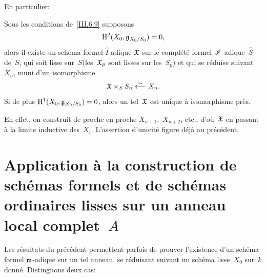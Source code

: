 En particulier:

\begin{corollaire}
\label{III.6.10}
Sous les conditions de~\ref{III.6.9} supposons
$$
\mathrm{H}^2(X_0,\mathfrak{g}_{X_0/S_0})=0,
$$
alors il existe un sch\'ema formel $\hat{I}$-adique
$\mathfrak{X}$
sur le compl\'et\'e formel $\cal{I}$-adique~$\hat{S}$ de~$S$, qui
soit \og lisse sur~$S$\fg (\ie les~$\mathfrak{X}_p$ sont lisses sur
les~$S_p$) et qui se r\'eduise suivant~$X_n$, \ie muni d'un
isomorphisme
$$
\mathfrak{X}\times_S S_n\overset{\sim}{\longleftarrow} X_n.
$$
Si de plus $\mathrm{H}^1(X_0,\mathfrak{g}_{X_0/S_0})=0$, alors un tel~$\mathfrak{X}$
est unique \`a isomorphisme pr\`es.
\end{corollaire}

En effet, on construit de proche en proche $X_{n+1}$,~$X_{n+2}$, etc.,
d'o\`u~$\mathfrak{X}$ en passant \`a la limite inductive des~$X_i$.
L'assertion d'unicit\'e figure d\'ej\`a au \no
pr\'ec\'edent.

\section[Application \`a la construction de sch\'emas formels...]{Application \`a la construction de sch\'emas formels
et de sch\'emas ordinaires lisses sur un anneau local complet~$A$}
\label{III.7}
Les r\'esultats du \no pr\'ec\'edent permettent parfois de
prouver l'existence
d'un sch\'ema formel $\mathfrak{m}$-adique sur un tel anneau, se
r\'eduisant suivant un sch\'ema lisse~$X_0$ sur~$k$
donn\'e. Distinguons deux cas:

